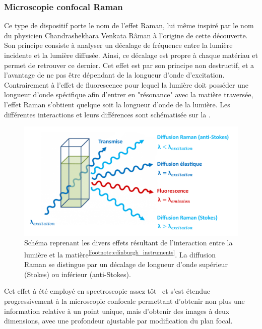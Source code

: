 \subsubsection{Microscopie confocal Raman}
Ce type de dispositif porte le nom de l'effet Raman, lui même inspiré par le nom du physicien Chandrashekhara Venkata Râman à  l'origine de cette découverte. Son principe consiste à analyser un décalage de fréquence entre la lumière incidente et la lumière diffusée. Ainsi, ce décalage est propre à chaque matériau et permet de retrouver ce dernier. Cet effet est par son principe non destructif, et a l'avantage de ne pas être dépendant de la longueur d'onde d'excitation. Contrairement à l'effet de fluorescence pour lequel la lumière doit posséder une longueur d'onde spécifique afin d'entrer en "résonance" avec la matière traversée, l'effet Raman s'obtient quelque soit la longueur d'onde de la lumière. Les différentes interactions et leurs différences sont schématisée sur la .\par

\begin{figure}[H]
    \centering
    \includegraphics[width=\linewidth]{contents/chapter_2/resources/scheme_principle_raman.pdf}
    \caption{Schéma reprenant les divers effets résultant de l'interaction entre la lumière et la matière\textsuperscript{\ref{footnote:edinburgh_instruments}}. La diffusion Raman se distingue par un décalage de longueur d'onde supérieur (Stokes) ou inférieur (anti-Stokes).}
    \label{fig:scheme_principle_raman}
\end{figure}\par

\addtocounter{footnote}{1}

Cet effet à été employé en spectroscopie assez tôt~\cite{Ferraro2003,Ferraro2003b} et s'est étendue progressivement à la microscopie confocale\cite{Casper2003} permettant d'obtenir non plus une information relative à un point unique, mais d'obtenir des images à deux dimensions, avec une profondeur ajustable par modification du plan focal.\par

